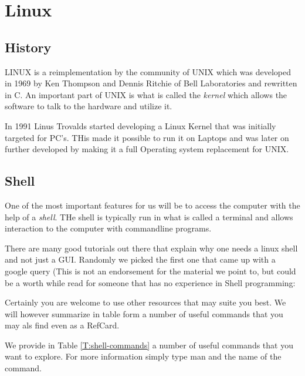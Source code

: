 

\chapter{Linux}
\label{C:linux}

\FILENAME

\section{History}

LINUX is a reimplementation by the community of UNIX which was
developed in 1969 by Ken Thompson and Dennis Ritchie of Bell
Laboratories and rewritten in C. An important part of UNIX is what is
called the {\em kernel} which allows the software to talk to
the hardware and utilize it. 

In 1991 Linus Trovalds started developing a Linux Kernel that was
initially targeted for PC's. THis made it possible to run it on
Laptops and was later on further developed by making it a full
Operating system replacement for UNIX. 

\section{Shell}

One of the most important features for us will be to access the
computer with the help of a {\em shell}. THe shell is typically run in
what is called a terminal and allows interaction to the computer with
commandline programs. 

There are many good tutorials out there that explain why one needs a
linux shell and not just a GUI. Randomly we picked the first one that
came up with a google query (This is not an endorsement for the material
we point to, but could be a worth while read for someone that has no
experience in Shell programming:


Certainly you are welcome to use other resources that may suite you
best. We will however summarize in table form a number of useful
commands that you may als find even as a RefCard.


We provide in Table \ref{T:shell-commands} a number of useful commands
that you want to explore. For more information simply type man and the
name of the command.



